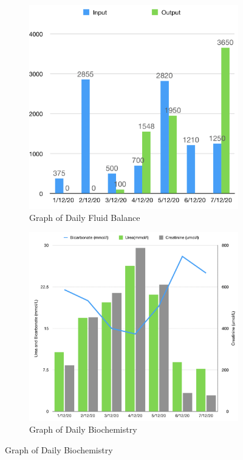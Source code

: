 \documentclass[11pt, ]{article}
\begin{document}
\begin{figure}
\begin{subfigure}{.5\textwidth}
\includegraphics[width=\textwidth]{InputOutput}
\caption{Graph of Daily Fluid Balance}
\end{subfigure}
\begin{subfigure}{.5\textwidth}
\includegraphics[width=\textwidth]{ubc}
\caption{Graph of Daily Biochemistry}
\end{subfigure}
\end{figure}
\end{document}

